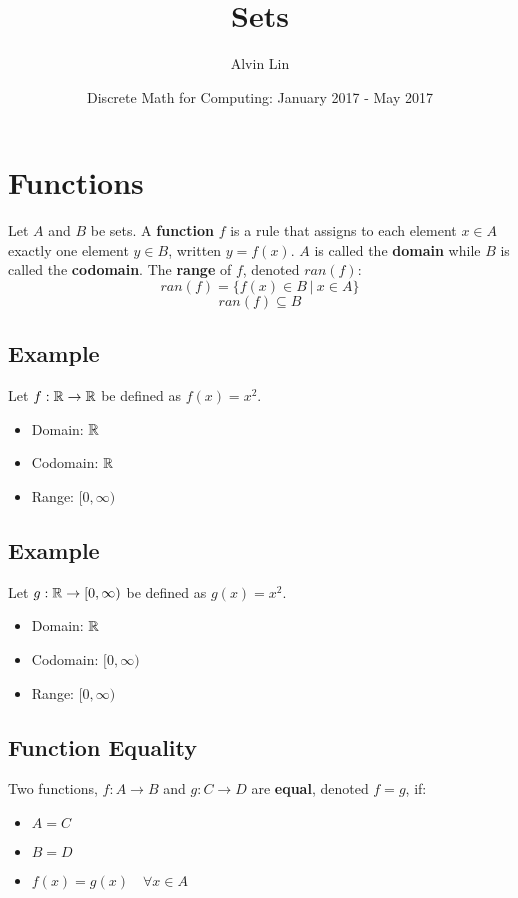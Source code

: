 \documentclass[letterpaper, 12pt]{math}
\title{Sets}
\author{Alvin Lin}
\date{Discrete Math for Computing: January 2017 - May 2017}
\begin{document}
\maketitle

\section*{Functions}
Let \( A \) and \( B \) be sets. A \textbf{function} \( f \) is a rule that
assigns to each element \( x \in A \) exactly one element \( y \in B \),
written \( y = f(x) \). \( A \) is called the \textbf{domain} while \( B \)
is called the \textbf{codomain}. The \textbf{range} of \( f \), denoted
\( ran(f) \):
\[ ran(f) = \{f(x) \in B\ |\ x \in A \} \]
\[ ran(f) \subseteq B \]

\subsection*{Example}
Let \( f:\mathbb{R}\to\mathbb{R} \) be defined as \( f(x) = x^{2} \).
\begin{itemize}
  \item Domain: \( \mathbb{R} \)
  \item Codomain: \( \mathbb{R} \)
  \item Range: \( \big[0,\infty\big) \)
\end{itemize}

\subsection*{Example}
Let \( g:\mathbb{R}\to[0,\infty) \) be defined as \( g(x) = x^{2} \).
\begin{itemize}
  \item Domain: \( \mathbb{R} \)
  \item Codomain: \( \big[0,\infty\big) \)
  \item Range: \( \big[0,\infty\big) \)
\end{itemize}

\subsection*{Function Equality}
Two functions, \( f:A\to B \) and \( g:C\to D \) are \textbf{equal}, denoted
\( f = g \), if:
\begin{itemize}
  \item \( A = C \)
  \item \( B = D \)
  \item \( f(x) = g(x) \quad \forall{x}\in A \)
\end{itemize}
\end{document}
